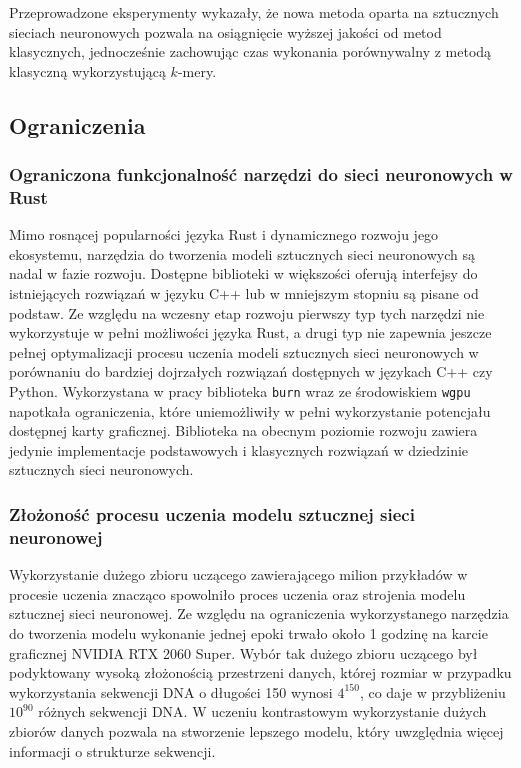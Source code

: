         Przeprowadzone eksperymenty wykazały, że nowa metoda oparta na sztucznych sieciach neuronowych pozwala na osiągnięcie wyższej jakości od metod klasycznych, jednocześnie zachowując czas wykonania porównywalny z metodą klasyczną wykorzystującą $k$-mery.

    \subsection{Ograniczenia}

        \subsubsection{Ograniczona funkcjonalność narzędzi do sieci neuronowych w Rust}

            Mimo rosnącej popularności języka Rust\cite{Rust:popularity} i dynamicznego rozwoju jego ekosystemu, narzędzia do tworzenia modeli sztucznych sieci neuronowych są nadal w fazie rozwoju. Dostępne biblioteki w większości oferują interfejsy do istniejących rozwiązań w języku C++ lub w mniejszym stopniu są pisane od podstaw. Ze względu na wczesny etap rozwoju pierwszy typ tych narzędzi nie wykorzystuje w pełni możliwości języka Rust, a drugi typ nie zapewnia jeszcze pełnej optymalizacji procesu uczenia modeli sztucznych sieci neuronowych w porównaniu do bardziej dojrzałych rozwiązań dostępnych w językach C++ czy Python. Wykorzystana w pracy biblioteka \texttt{burn} wraz ze środowiskiem \texttt{wgpu} napotkała ograniczenia, które uniemożliwiły w pełni wykorzystanie potencjału dostępnej karty graficznej. Biblioteka na obecnym poziomie rozwoju zawiera jedynie implementacje podstawowych i klasycznych rozwiązań w dziedzinie sztucznych sieci neuronowych.

        \subsubsection{Złożoność procesu uczenia modelu sztucznej sieci neuronowej}

            Wykorzystanie dużego zbioru uczącego zawierającego milion przykładów w procesie uczenia znacząco spowolniło proces uczenia oraz strojenia modelu sztucznej sieci neuronowej. Ze względu na ograniczenia wykorzystanego narzędzia do tworzenia modelu wykonanie jednej epoki trwało około 1 godzinę na karcie graficznej NVIDIA RTX 2060 Super. Wybór tak dużego zbioru uczącego był podyktowany wysoką złożonością przestrzeni danych, której rozmiar w przypadku wykorzystania sekwencji DNA o długości 150 wynosi $4^{150}$, co daje w przybliżeniu $10^{90}$ różnych sekwencji DNA. W uczeniu kontrastowym wykorzystanie dużych zbiorów danych pozwala na stworzenie lepszego modelu, który uwzględnia więcej informacji o strukturze sekwencji.

